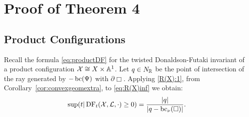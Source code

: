 \section{Proof of Theorem 4}
\subsection{Product Configurations}
Recall the formula \normalfont{(}\ref{eq:productDF}\normalfont{)} for the twisted Donaldson-Futaki invariant of a product configuration \({\mathcal{X}} \cong X \times \mathbb{A}^1\).
Let \(q \in N_{\mathbb{R}}\) be the point of intersection of the ray generated by \(-\mathop{\rm bc}\nolimits(\Psi)\) with \(\partial \Box\). Applying \normalfont{(}\ref{R(X):1}\normalfont{)}, from Corollary~\ref{cor:convexgeomextra}, to \normalfont{(}\ref{eq:R(X)inf}\normalfont{)} we obtain:
\[
\sup(t | \mathop{\rm DF}\nolimits_t({\mathcal{X}},\mathcal{L},\cdot) \ge 0) = \frac{|q|}{|q-\mathop{\rm bc}\nolimits_\nu(\Box)|}.
\]
